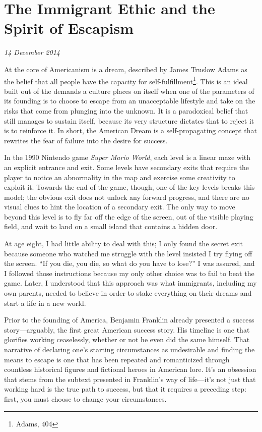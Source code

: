 \section{The Immigrant Ethic and the Spirit of Escapism}

\textit{14 December 2014}

At the core of Americanism is a dream, described by James Truslow Adams as the
belief that all people have the capacity for self-fulfillment\footnote{Adams,
404}. This is an ideal built out of the demands a culture places on itself when
one of the parameters of its founding is to choose to escape from an
unacceptable lifestyle and take on the risks that come from plunging into the
unknown. It is a paradoxical belief that still manages to sustain itself,
because its very structure dictates that to reject it is to reinforce it.  In
short, the American Dream is a self-propagating concept that rewrites the fear
of failure into the desire for success.

In the 1990 Nintendo game \textit{Super Mario World}, each level is a linear
maze with an explicit entrance and exit. Some levels have secondary exits that
require the player to notice an abnormality in the map and exercise some
creativity to exploit it. Towards the end of the game, though, one of the key
levels breaks this model; the obvious exit does not unlock any forward progress,
and there are no visual clues to hint the location of a secondary exit. The only
way to move beyond this level is to fly far off the edge of the screen, out of
the visible playing field, and wait to land on a small island that contains a
hidden door.

At age eight, I had little ability to deal with this; I only found the secret
exit because someone who watched me struggle with the level insisted I try
flying off the screen. ``If you die, you die, so what do you have to lose?'' I
was assured, and I followed those instructions because my only other choice was
to fail to beat the game. Later, I understood that this approach was what
immigrants, including my own parents, needed to believe in order to stake
everything on their dreams and start a life in a new world.

Prior to the founding of America, Benjamin Franklin already presented a success
story---arguably, the first great American success story. His timeline is one
that glorifies working ceaselessly, whether or not he even did the same himself.
That narrative of declaring one's starting circumstances as undesirable and
finding the means to escape is one that has been repeated and romanticized
through countless historical figures and fictional heroes in American lore. It's
an obsession that stems from the subtext presented in Franklin's way of
life---it's not just that working hard is the true path to success, but that it
requires a preceding step: first, you must choose to change your circumstances.


